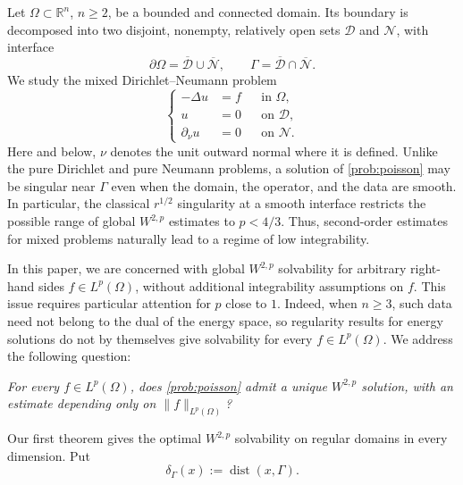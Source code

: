 \documentclass[12pt]{amsart}
\numberwithin{equation}{section}
\newcommand{\bR}{\mathbb{R}}
\newcommand\cD{\mathcal{D}}
\newcommand\cN{\mathcal{N}}
\newcommand\dist{\operatorname{dist}}
\newcommand{\p}{\partial}
\begin{document}
Let $\Omega\subset\bR^n$, $n\geq2$, be a bounded and connected domain. Its
boundary is decomposed into two disjoint, nonempty, relatively open sets
$\cD$ and $\cN$, with interface
\[
 \p\Omega=\overline{\cD}\cup\overline{\cN},
 \qquad
 \Gamma=\overline{\cD}\cap\overline{\cN}.
\]
We study the mixed Dirichlet--Neumann problem
\begin{equation}
 \left\{
 \begin{aligned}
  -\Delta u&=f &&\text{in }\Omega,\\
  u&=0 &&\text{on }\cD,\\
  \partial_\nu u&=0 &&\text{on }\cN.
 \end{aligned}
 \right.
 \tag{P}
 \label{prob:poisson}
\end{equation}
Here and below, $\nu$ denotes the unit outward normal where it is defined.
Unlike the pure Dirichlet and pure Neumann problems, a solution of
\eqref{prob:poisson} may be singular near $\Gamma$ even when the domain,
the operator, and the data are smooth. 
In particular, the classical
$r^{1/2}$ singularity at a smooth interface restricts the possible range
of global $W^{2,p}$ estimates to $p<4/3$. Thus, second-order estimates
for mixed problems naturally lead to a regime of low integrability.


In this paper, we are concerned with global $W^{2,p}$ solvability for
arbitrary right-hand sides $f\in L^p(\Omega)$, without additional
integrability assumptions on $f$. This issue requires particular
attention for $p$ close to $1$. Indeed, when $n\geq3$, such data need
not belong to the dual of the energy space, so regularity results for
energy solutions do not by themselves give solvability for every
$f\in L^p(\Omega)$. We address the following question:
\begin{center}
\textit{For every $f\in L^p(\Omega)$, does \eqref{prob:poisson} admit
a unique $W^{2,p}$ solution, with an estimate depending only on
$\|f\|_{L^p(\Omega)}$?}
\end{center}

Our first theorem gives the optimal $W^{2,p}$ solvability on regular
domains in every dimension.  Put
\[
 \delta_\Gamma(x):=\dist(x,\Gamma).
\]
\end{document}

